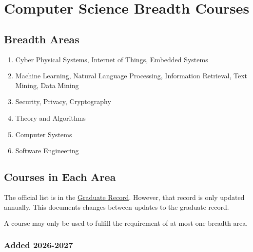 \newpage

\hypertarget{appendix-breadth-courses}{
	\section{Computer Science Breadth Courses}
	\label{appendix-cs-breadth}
}




\subsection{Breadth Areas}

\begin{enumerate}[nosep]
	\item Cyber Physical Systems, Internet of Things, Embedded Systems
	\item Machine Learning, Natural Language Processing, Information Retrieval, Text Mining, Data Mining
	\item Security, Privacy, Cryptography
	\item Theory and Algorithms
	\item Computer Systems
	\item Software Engineering
\end{enumerate}

\subsection{Courses in Each Area}

The official list is in the \href{\GRBC}{Graduate Record}.
However, that record is only updated annually. This documents changes between
updates to the graduate record.

A course may only be used to fulfill the requirement of at most one breadth area.


\subsubsection{Added 2026-2027}


